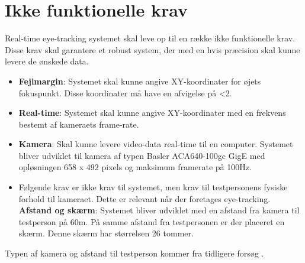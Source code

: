 \documentclass[kravspec.tex]{subfiles}
\begin{document}
	
\section{Ikke funktionelle krav}
Real-time eye-tracking systemet skal leve op til en række ikke funktionelle krav. Disse krav skal garantere et robust system, der med en hvis præcision skal kunne levere de ønskede data.\\
\begin{itemize}
	\item 
	\textbf{Fejlmargin}: Systemet skal kunne angive XY-koordinater for øjets fokuspunkt. Disse koordinater må have en afvigelse på <2\degree \cite{FairchildInSiboska}.
	\item 
	\textbf{Real-time}: Systemet skal kunne angive XY-koordinater med en frekvens bestemt af kameraets frame-rate. 
	\item
	\textbf{Kamera}: Skal kunne levere video-data real-time til en computer. Systemet bliver udviklet til kamera af typen Basler
	ACA640-100gc GigE med opløsningen 658 x 492 pixels og maksimum framerate på 100Hz.
	\item Følgende krav er ikke krav til systemet, men krav til testpersonens fysiske forhold til kameraet. Dette er relevant når der foretages eye-tracking. \\
	\textbf{Afstand og skærm}: Systemet bliver udviklet med en afstand fra kamera til testperson på 60m. 
	På samme afstand fra testpersonen er der placeret en skærm. Denne skærm har størrelsen 26 tommer.
\end{itemize}

Typen af kamera og afstand til testperson kommer fra tidligere forsøg \cite{Siboska}.
\end{document}
